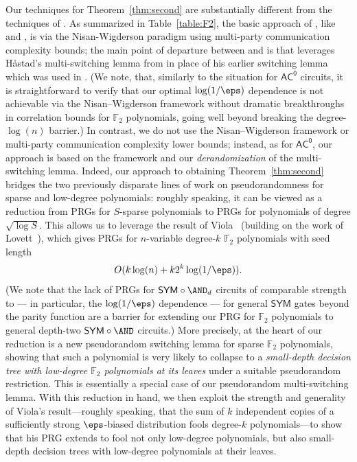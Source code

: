 \documentclass{toc}
\theoremstyle{plain}
\newcommand{\acz}{\mathsf{AC^0}}
\newcommand{\SYM}{\mathsf{SYM}}
\renewcommand{\F}{\mathds{F}}
\begin{document}
Our techniques for Theorem~\ref{thm:second} are substantially different from the techniques of \cite{ST18,Vio06}.  As summarized in Table~\ref{table:F2}, the basic approach of \cite{ST18}, like \cite{Vio06} and \cite{LVW93}, is via the Nisan-Wigderson paradigm using multi-party communication complexity bounds; the main point of departure 
between \cite{ST18} and \cite{Vio06} is that \cite{ST18} leverages
H{\aa}stad's multi-switching lemma from \cite{Has14} in place of his earlier \cite{Hastad86} switching lemma which was used in \cite{Vio06}.  (We note, that, %
similarly  %
to the situation for $\acz$ circuits, it is straightforward to verify that our optimal $\log(1/\eps)$ dependence is not achievable via the Nisan--Wigderson framework without dramatic breakthroughs in correlation bounds for $\F_2$ polynomials, going well beyond breaking the degree-$\log(n)$ %
barrier.) In contrast, we do not use the Nisan--Wigderson framework or multi-party communication complexity lower bounds; instead, as for $\acz$, our approach is based on the \cite{AjtaiWigderson:85} framework and our \emph{derandomization} of the \cite{Has14} multi-switching lemma.  Indeed, our approach to obtaining Theorem~\ref{thm:second} bridges the two previously disparate lines of work on pseudorandomness for sparse and low-degree %
polynomials: roughly speaking, it can be viewed as a reduction from PRGs for $S$-sparse polynomials to PRGs for
%
polynomials of degree $\sqrt{\log S}$.  %
This allows us to leverage the result of Viola~\cite{Vio09} (building on the work of Lovett~\cite{Lov09}), which gives PRGs for $n$-variable degree-$k$ $\F_2$ polynomials with seed length 
\[ O(k\log(n) + k2^{k}\log(1/\eps)). \] 
(We note that the lack of PRGs  for $\SYM \circ \AND_d$ circuits of comparable strength to \cite{Vio09,Lov09} --- in particular, the $\log(1/\eps)$ dependence --- for general $\SYM$ gates beyond the parity function are a barrier for extending our PRG for $\F_2$ polynomials to general depth-two $\SYM \circ \AND$ circuits.) More precisely, at the heart of our reduction is a new pseudorandom switching lemma for sparse $\F_2$ polynomials, showing that such a polynomial is very likely to collapse to a \emph{small-depth decision tree with low-degree $\F_2$ polynomials at its leaves} under a suitable pseudorandom restriction.  This is essentially a special case of our pseudorandom multi-switching lemma.  With this reduction in hand, we then exploit the strength and generality of Viola's result---roughly speaking, that the sum of $k$ independent copies of a sufficiently strong $\eps$-biased distribution fools degree-$k$ polynomials---to show that his PRG extends to fool not only low-degree polynomials, but also small-depth decision trees with low-degree polynomials at their leaves. 
\end{document}
